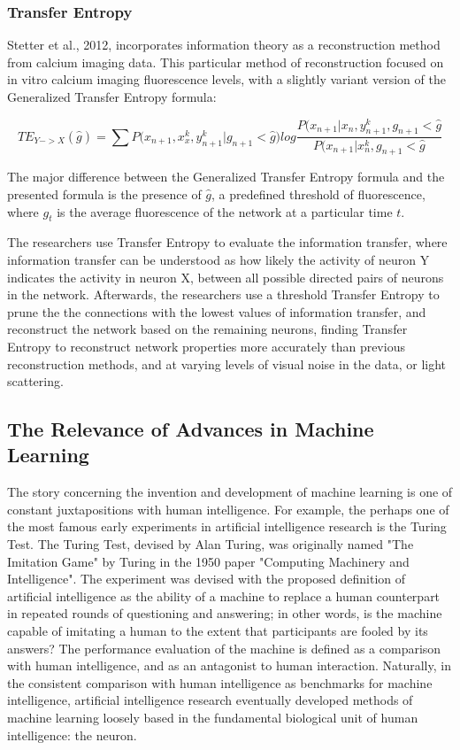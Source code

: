 \documentclass[11pt]{article}
\begin{document}
\subsubsection{Transfer Entropy}
Stetter et al., 2012, incorporates information theory as a reconstruction method from calcium imaging data. This particular method of reconstruction focused on in vitro calcium imaging fluorescence levels, with a slightly variant version of the Generalized Transfer Entropy formula:

$$TE_{Y->X}(\hat{g}) = \sum{P(x_{n+1}, x_x^k,y_{n+1}^k|g_{n+1}<\hat{g}}) log \frac{P(x_{n+1}|x_n,y_{n+1}^k,g_{n+1}<\hat{g}}{P(x_{n+1}|x_n^k,g_{n+1}<\hat{g}}$$

The major difference between the Generalized Transfer Entropy formula and the presented formula is the presence of $\hat{g}$, a predefined threshold of fluorescence, where $g_t$ is the average fluorescence of the network at a particular time $t$.\par

The researchers use Transfer Entropy to evaluate the information transfer, where information transfer can be understood as how likely the activity of neuron Y indicates the activity in neuron X, between all possible directed pairs of neurons in the network. Afterwards, the researchers use a threshold Transfer Entropy to prune the the connections with the lowest values of information transfer, and reconstruct the network based on the remaining neurons, finding Transfer Entropy to reconstruct network properties more accurately than previous reconstruction methods, and at varying levels of visual noise in the data, or light scattering.\par

\subsection{The Relevance of Advances in Machine Learning}
The story concerning the invention and development of machine learning is one of constant juxtapositions with human intelligence. For example, the perhaps one of the most famous early experiments in artificial intelligence research is the Turing Test. The Turing Test, devised by Alan Turing, was originally named "The Imitation Game" by Turing in the 1950 paper "Computing Machinery and Intelligence". The experiment was devised with the proposed definition of artificial intelligence as the ability of a machine to replace a human counterpart in repeated rounds of questioning and answering; in other words, is the machine capable of imitating a human to the extent that participants are fooled by its answers? The performance evaluation of the machine is defined as a comparison with human intelligence, and as an antagonist to human interaction. Naturally, in the consistent comparison with human intelligence as benchmarks for machine intelligence, artificial intelligence research eventually developed methods of machine learning loosely based in the fundamental biological unit of human intelligence: the neuron.\par
\end{document}
